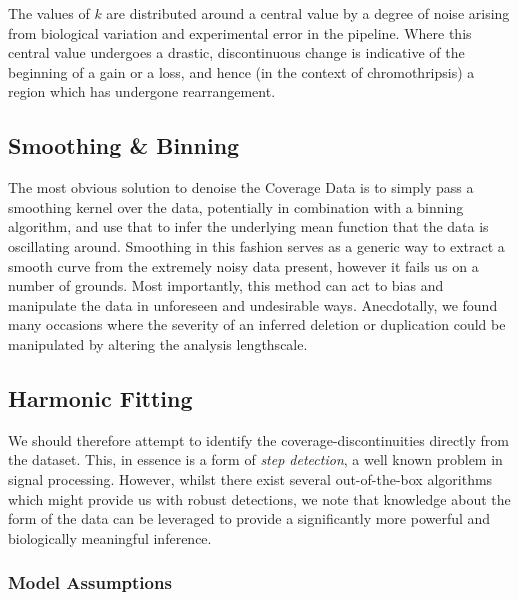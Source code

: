 \documentclass[fleqn,usenatbib]{acmart}
\begin{document}
			The values of $k$ are distributed around a central value by a degree of noise arising from biological variation and experimental error in the pipeline. Where this central value undergoes a drastic, discontinuous change is indicative of the beginning of a gain or a loss, and hence (in the context of chromothripsis) a region which has undergone rearrangement.

		\subsection{Smoothing \& Binning}

			{The most obvious solution to denoise the Coverage Data is to simply pass a smoothing kernel over the data, potentially in combination with a binning algorithm, and use that to infer the underlying mean function that the data is oscillating around. Smoothing in this fashion serves as a generic way to extract a smooth curve from the extremely noisy data present, however it fails us on a number of grounds. Most importantly, this method can act to bias and manipulate the data in unforeseen and undesirable ways. Anecdotally, we found many occasions where the severity of an inferred deletion or duplication could be manipulated by altering the analysis lengthscale. }
			
	


		\subsection{Harmonic Fitting}


			We should therefore attempt to identify the coverage-discontinuities directly from the dataset. This, in essence is a form of \textit{step detection}, a well known problem in signal processing. However, whilst there exist several out-of-the-box algorithms which might provide us with robust detections, we note that knowledge about the form of the data can be leveraged to provide a significantly more powerful and biologically meaningful inference. 
			
			\subsubsection{Model Assumptions}
			
\end{document}
